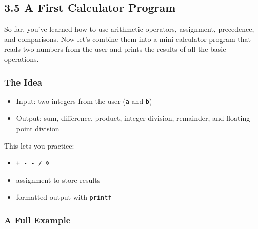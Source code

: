 \documentclass[
  letterpaper,
  DIV=11,
  numbers=noendperiod]{scrreprt}
\providecommand{\tightlist}{%
  \setlength{\itemsep}{0pt}\setlength{\parskip}{0pt}}
\begin{document}
\subsection{3.5 A First Calculator
Program}\label{a-first-calculator-program}

So far, you've learned how to use arithmetic operators, assignment,
precedence, and comparisons. Now let's combine them into a mini
calculator program that reads two numbers from the user and prints the
results of all the basic operations.

\subsubsection{The Idea}\label{the-idea}

\begin{itemize}
\tightlist
\item
  Input: two integers from the user (\texttt{a} and \texttt{b})
\item
  Output: sum, difference, product, integer division, remainder, and
  floating-point division
\end{itemize}

This lets you practice:

\begin{itemize}
\tightlist
\item
  \texttt{+\ -\ -\ /\ \%}
\item
  assignment to store results
\item
  formatted output with \texttt{printf}
\end{itemize}

\subsubsection{A Full Example}\label{a-full-example-8}
\end{document}
